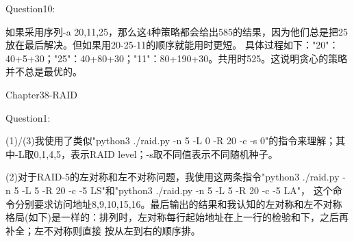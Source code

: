 \documentclass[12pt]{article}
\begin{document}
\noindent Question10:\par
如果采用序列-a 20,11,25，那么这4种策略都会给出585的结果，因为他们总是把25放在最后解决。但如果用20-25-11的顺序就能用时更短。
具体过程如下："20"：40+5+30；"25"：40+80+30；"11"：80+190+30。共用时525。这说明贪心的策略并不总是最优的。
\newpage
\begin{large}
    \noindent Chapter38-RAID\\
\end{large}
Question1:\par
    (1)/(3)我使用了类似"python3 ./raid.py -n 5 -L 0 -R 20 -c -s 0"的指令来理解；其中-L取0,1,4,5，表示RAID level；-s取不同值表示不同随机种子。\par
    (2)对于RAID-5的左对称和左不对称问题，我使用这两条指令"python3 ./raid.py -n 5 -L 5 -R 20 -c -5 LS"和"python3 ./raid.py -n 5 -L 5 -R 20 -c -5 LA"，
这个命令分别要求访问地址8,9,10,15,16。最后输出的结果和我认知的左对称和左不对称格局(如下)是一样的：排列时，左对称每行起始地址在上一行的检验和下，之后再补全；左不对称则直接
按从左到右的顺序排。
\begin{figure}[!h]
    \centering
    \hfill
\end{figure}\\
\end{document}
